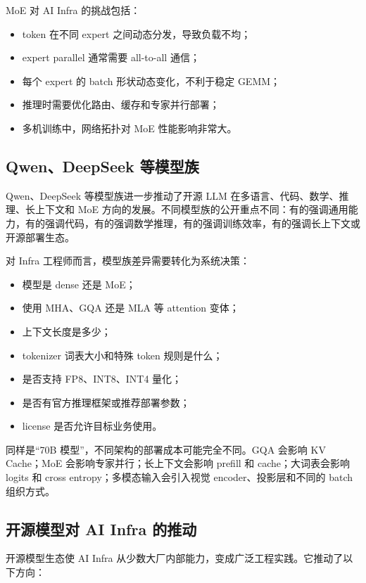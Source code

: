 MoE 对 AI Infra 的挑战包括：

\begin{itemize}
\item token 在不同 expert 之间动态分发，导致负载不均；
\item expert parallel 通常需要 all-to-all 通信；
\item 每个 expert 的 batch 形状动态变化，不利于稳定 GEMM；
\item 推理时需要优化路由、缓存和专家并行部署；
\item 多机训练中，网络拓扑对 MoE 性能影响非常大。
\end{itemize}

\subsection{Qwen、DeepSeek 等模型族}
\label{subsec:qwen-deepseek-and-others}

Qwen、DeepSeek 等模型族进一步推动了开源 LLM 在多语言、代码、数学、推理、长上下文和 MoE 方向的发展。不同模型族的公开重点不同：有的强调通用能力，有的强调代码，有的强调数学推理，有的强调训练效率，有的强调长上下文或开源部署生态。

对 Infra 工程师而言，模型族差异需要转化为系统决策：

\begin{itemize}
\item 模型是 dense 还是 MoE；
\item 使用 MHA、GQA 还是 MLA 等 attention 变体；
\item 上下文长度是多少；
\item tokenizer 词表大小和特殊 token 规则是什么；
\item 是否支持 FP8、INT8、INT4 量化；
\item 是否有官方推理框架或推荐部署参数；
\item license 是否允许目标业务使用。
\end{itemize}

同样是“70B 模型”，不同架构的部署成本可能完全不同。GQA 会影响 KV Cache；MoE 会影响专家并行；长上下文会影响 prefill 和 cache；大词表会影响 logits 和 cross entropy；多模态输入会引入视觉 encoder、投影层和不同的 batch 组织方式。

\subsection{开源模型对 AI Infra 的推动}
\label{subsec:open-models-push-ai-infra}

开源模型生态使 AI Infra 从少数大厂内部能力，变成广泛工程实践。它推动了以下方向：

